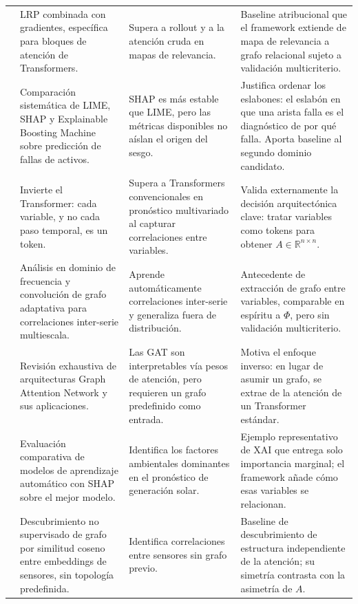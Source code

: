 {\begin{longtable}{P{0.19}P{0.25}P{0.28}P{0.28}}
\cite{chefer2021transformer} & LRP combinada con gradientes, específica para bloques de atención de Transformers. & Supera a rollout y a la atención cruda en mapas de relevancia. & Baseline atribucional que el framework extiende de mapa de relevancia a grafo relacional sujeto a validación multicriterio.\\
\cite{jakubowski2022performance} & Comparación sistemática de LIME, SHAP y Explainable Boosting Machine sobre predicción de fallas de activos. & SHAP es más estable que LIME, pero las métricas disponibles no aíslan el origen del sesgo. & Justifica ordenar los eslabones: el eslabón en que una arista falla es el diagnóstico de por qué falla. Aporta baseline al segundo dominio candidato.\\
\cite{liu2024itransformer} & Invierte el Transformer: cada variable, y no cada paso temporal, es un token. & Supera a Transformers convencionales en pronóstico multivariado al capturar correlaciones entre variables. & Valida externamente la decisión arquitectónica clave: tratar variables como tokens para obtener $A\in\mathbb{R}^{n\times n}$.\\
\cite{cai2024msgnet} & Análisis en dominio de frecuencia y convolución de grafo adaptativa para correlaciones inter-serie multiescala. & Aprende automáticamente correlaciones inter-serie y generaliza fuera de distribución. & Antecedente de extracción de grafo entre variables, comparable en espíritu a $\Phi$, pero sin validación multicriterio.\\
\cite{vrahatis2024graph} & Revisión exhaustiva de arquitecturas Graph Attention Network y sus aplicaciones. & Las GAT son interpretables vía pesos de atención, pero requieren un grafo predefinido como entrada. & Motiva el enfoque inverso: en lugar de asumir un grafo, se extrae de la atención de un Transformer estándar.\\
\cite{petrosian2024solar} & Evaluación comparativa de modelos de aprendizaje automático con SHAP sobre el mejor modelo. & Identifica los factores ambientales dominantes en el pronóstico de generación solar. & Ejemplo representativo de XAI que entrega solo importancia marginal; el framework añade cómo esas variables se relacionan.\\
\cite{tew2024kans} & Descubrimiento no supervisado de grafo por similitud coseno entre embeddings de sensores, sin topología predefinida. & Identifica correlaciones entre sensores sin grafo previo. & Baseline de descubrimiento de estructura independiente de la atención; su simetría contrasta con la asimetría de $A$.\\

\end{longtable}}
